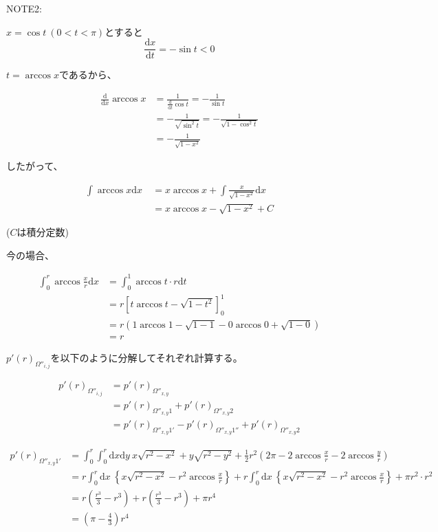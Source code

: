 NOTE2:

$x = \cos t \ (0< t< \pi)$とすると
$$\frac{\mathrm{d}x}{\mathrm{d}t} = - \sin t < 0$$

$t = \arccos x$であるから、

\begin{align}
\frac{\mathrm{d}}{\mathrm{d}x}\arccos x &= \frac{1}{\frac{\mathrm{d}}{\mathrm{d}t}\cos t} = -\frac{1}{\sin t}\nonumber \\
&=- \frac{1}{\sqrt{\sin^{2}t}} = - \frac{1}{\sqrt{1- \cos^{2}t}} \nonumber \\
&= - \frac{1}{\sqrt{1- x^{2}}}
\end{align}

したがって、

\begin{align}
\int \arccos x \mathrm{d}x\  &= x\arccos x + \int \frac{x}{\sqrt{1-x^{2}}}\mathrm{d}x\nonumber \\
&=x\arccos x - \sqrt{1-x^{2}} + C
\end{align}

($C$は積分定数)

今の場合、

\begin{align}
\int^{r}_{0} \arccos \frac{x}{r} \mathrm{d}x &= \int^{1}_{0}\arccos t \cdot r\mathrm{d}t\nonumber \\
&= r \left[ t \arccos t - \sqrt{1-t^{2}} \right]^{1}_{0}\nonumber \\
&= r ( 1\arccos1 -\sqrt{1-1} - 0 \arccos0 + \sqrt{1-0})\nonumber \\
&= r
\end{align}

$p'(r)_{\Omega''_{i,j}}$を以下のように分解してそれぞれ計算する。

\begin{align}
p'(r)_{\Omega''_{i,j}} &= p'(r)_{\Omega''_{x, y}}\nonumber \\
&= p'(r)_{\Omega''_{x, y}1}  +p'(r)_{\Omega''_{x, y}2}\nonumber \\
&= p'(r)_{\Omega''_{x, y}1'} - p'(r)_{\Omega''_{x, y}1''} + p'(r)_{\Omega''_{x, y}2}
\end{align}

\begin{align}
p'(r)_{\Omega''_{x,y}1'} &= \int^{r}_{0}\int^{r}_{0}\mathrm{d}x\mathrm{d}y\ x\sqrt{r^{2}-x^{2}} + y \sqrt{r^{2} -y^{2}} + \frac{1}{2}r^{2}\left( 2\pi -2\arccos\frac{x}{r} -2\arccos\frac{y}{r} \right) \nonumber \\
&= r\int^{r}_{0}\mathrm{d}x\ \left\{x\sqrt{r^{2}-x^{2}} - r^{2}\arccos\frac{x}{r} \right\} + r\int^{r}_{0}\mathrm{d}x\ \left\{x\sqrt{r^{2}-x^{2}} - r^{2}\arccos\frac{x}{r} \right\} + \pi r^{2}\cdot r^{2}\nonumber \\
&= r\left( \frac{r^{3}}{3} -r^{3} \right) + r\left( \frac{r^{3}}{3} -r^{3} \right) + \pi r^{4}\nonumber \\
&=  \left(\pi -\frac{4}{3}\right)r^{4}
\end{align}

